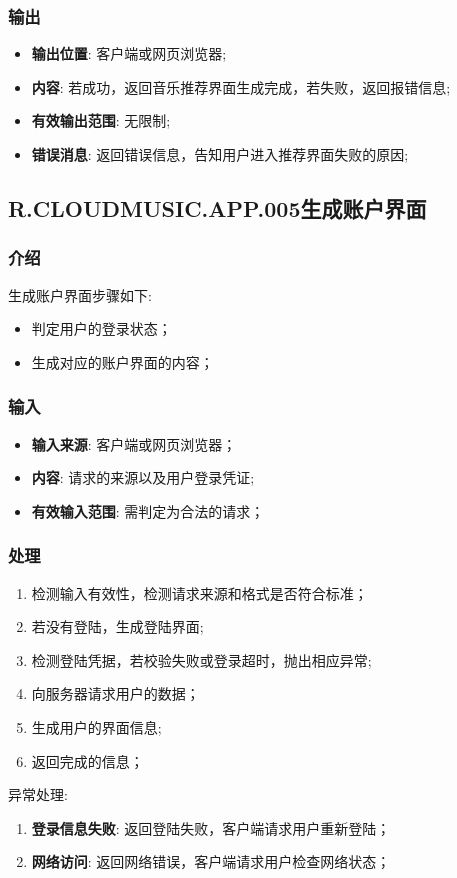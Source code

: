 \subsubsection{输出}
\begin{itemize}
	\item \textbf{输出位置}: 客户端或网页浏览器;
	\item \textbf{内容}: 若成功，返回音乐推荐界面生成完成，若失败，返回报错信息;
	\item \textbf{有效输出范围}: 无限制;
	\item \textbf{错误消息}: 返回错误信息，告知用户进入推荐界面失败的原因;
\end{itemize}

\subsection{R.CLOUDMUSIC.APP.005生成账户界面}
\subsubsection{介绍}
	生成账户界面步骤如下: 
	\begin{itemize}
		\item 判定用户的登录状态；
		\item 生成对应的账户界面的内容；
	\end{itemize}
\subsubsection{输入}
	\begin{itemize}
		\item \textbf{输入来源}: 客户端或网页浏览器；
		\item \textbf{内容}: 请求的来源以及用户登录凭证;
		\item \textbf{有效输入范围}: 需判定为合法的请求；
	\end{itemize}
\subsubsection{处理}
	\begin{enumerate}
		\item 检测输入有效性，检测请求来源和格式是否符合标准；
		\item 若没有登陆，生成登陆界面;
		\item 检测登陆凭据，若校验失败或登录超时，抛出相应异常;
		\item 向服务器请求用户的数据；
		\item 生成用户的界面信息;
		\item 返回完成的信息；
	\end{enumerate}
	\noindent 异常处理: 
	\begin{enumerate}
		\item \textbf{登录信息失败}: 返回登陆失败，客户端请求用户重新登陆；
		\item \textbf{网络访问}: 返回网络错误，客户端请求用户检查网络状态；
	\end{enumerate}
